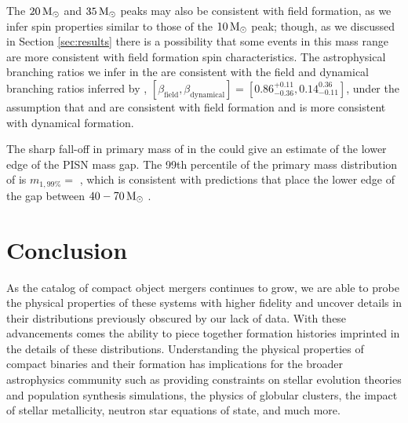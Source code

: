  The $20{\,\rm M}_\odot$ and $35{\,\rm M}_\odot$ peaks may also be consistent with field formation, as we infer spin properties similar to those of the $10{\,\rm M}_\odot$ peak; though, as we discussed in Section \ref{sec:results} there is a possibility that some events in this mass range are more consistent with field formation spin characteristics. The astrophysical branching ratios we infer in the \comp{} are consistent with the field and dynamical branching ratios inferred by \citet{2011.10057}, $[\beta_{\text{field}}, \beta_{\text{dynamical}}] = [0.86^{+0.11}_{-0.36}, 0.14^{0.36}_{-0.11}]$, under the assumption that \first{} and \contA{} are consistent with field formation and \contB{} is more consistent with dynamical formation.

The sharp fall-off in primary mass of \contA{} in the \comp{} could give an estimate of the lower edge of the PISN mass gap. The 99th percentile of the primary mass distribution of \contA{} is $m_{1,99\%} = $ \result{$\CIPlusMinus{\macros[Mass][Composite][ContinuumA][99percentile]}$ \msun}, which is consistent with predictions that place the lower edge of the gap between $40-70{\,\rm M}_\odot$ \citep{1901.00215,1910.12874v1,2103.07933v1,2104.07783v2}.

\section{Conclusion} \label{sec:conclusion}

As the catalog of compact object mergers continues to grow, we are able to probe the physical properties of these systems with higher fidelity and uncover details in their distributions previously obscured by our lack of data. With these advancements comes the ability to piece together formation histories imprinted in the details of these distributions. Understanding the physical properties of compact binaries and their formation has implications for the broader astrophysics community such as providing constraints on stellar evolution theories and population synthesis simulations, the physics of globular clusters, the impact of stellar metallicity, neutron star equations of state, and much more.

